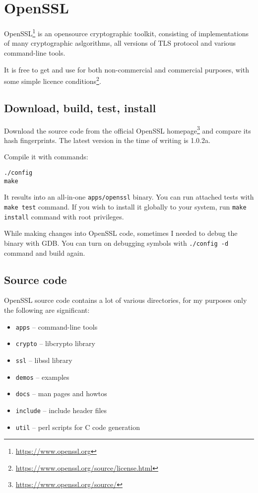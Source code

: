 \chapter{OpenSSL}

OpenSSL\footnote{\url{https://www.openssl.org}} is an opensource cryptographic toolkit, consisting of implementations of many cryptographic aslgorithms, all versions of TLS protocol and various command-line tools.

It is free to get and use for both non-commercial and commercial purposes, with some simple licence conditions\footnote{\url{https://www.openssl.org/source/license.html}}.


\section{Download, build, test, install}

Download the source code from the official OpenSSL homepage\footnote{\url{https://www.openssl.org/source/}} and compare its hash fingerprints. The latest version in the time of writing is 1.0.2a.

Compile it with commands:

\begin{verbatim}
./config
make
\end{verbatim}

It results into an all-in-one \texttt{apps/openssl} binary. You can run attached tests with \texttt{make test} command. If you wish to install it globally to your system, run \texttt{make install} command with root privileges.

While making changes into OpenSSL code, sometimes I needed to debug the binary with GDB. You can turn on debugging symbols with \texttt{./config -d} command and build again.


\section{Source code}

OpenSSL source code contains a lot of various directories, for my purposes only the following are significant:

\begin{itemize}
  \item \texttt{apps} -- command-line tools
  \item \texttt{crypto} -- libcrypto library
  \item \texttt{ssl} -- libssl library
  \item \texttt{demos} -- examples
  \item \texttt{docs} -- man pages and howtos
  \item \texttt{include} -- include header files
  \item \texttt{util} -- perl scripts for C code generation
\end{itemize}

